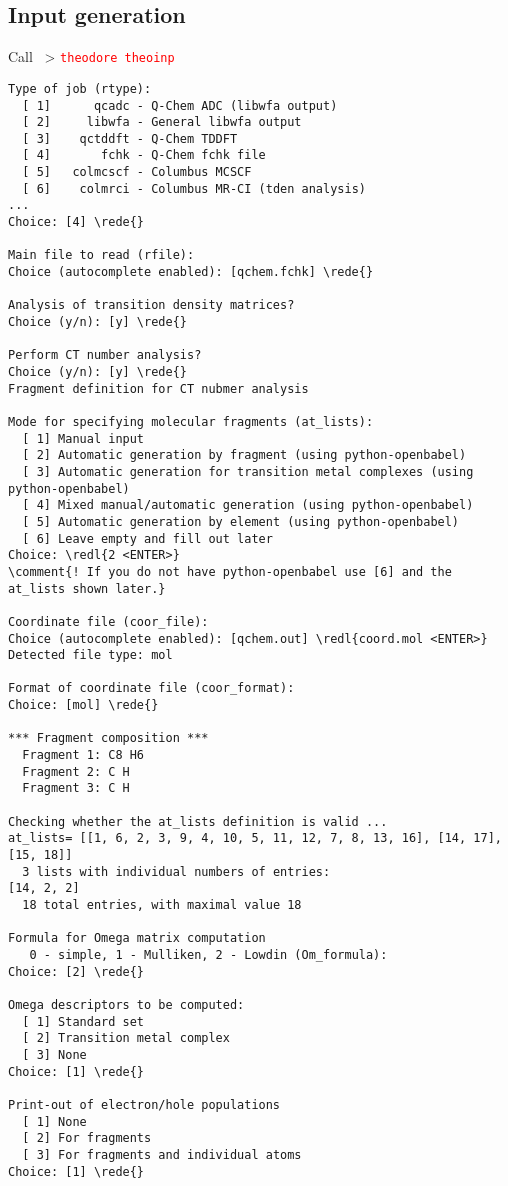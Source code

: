 \documentclass[DIV=12,headings=normal]{scrartcl}
\newcommand{\comment}[1]{\textcolor{blue}{#1}}
\newcommand{\redl}[1]{{\textcolor{red}{\texttt{#1}}}}
\newcommand{\rede}[1]{\redl{#1 <ENTER>}}
\newcommand{\comm}[1]{
\small
~> \redl{#1}
\normalsize
}
\newcounter{number}
\begin{document}
\clearpage
\subsection{Input generation}
Call \comm{theodore theoinp}
\scriptsize
\begin{Verbatim}[commandchars=\\\{\}]
Type of job (rtype):
  [ 1]      qcadc - Q-Chem ADC (libwfa output)
  [ 2]     libwfa - General libwfa output
  [ 3]    qctddft - Q-Chem TDDFT
  [ 4]       fchk - Q-Chem fchk file
  [ 5]   colmcscf - Columbus MCSCF
  [ 6]    colmrci - Columbus MR-CI (tden analysis)
...
Choice: [4] \rede{}

Main file to read (rfile):
Choice (autocomplete enabled): [qchem.fchk] \rede{}

Analysis of transition density matrices?
Choice (y/n): [y] \rede{}

Perform CT number analysis?
Choice (y/n): [y] \rede{}
Fragment definition for CT nubmer analysis

Mode for specifying molecular fragments (at_lists):
  [ 1] Manual input
  [ 2] Automatic generation by fragment (using python-openbabel)
  [ 3] Automatic generation for transition metal complexes (using python-openbabel)
  [ 4] Mixed manual/automatic generation (using python-openbabel)
  [ 5] Automatic generation by element (using python-openbabel)
  [ 6] Leave empty and fill out later
Choice: \redl{2 <ENTER>}
\comment{! If you do not have python-openbabel use [6] and the at_lists shown later.}

Coordinate file (coor_file):
Choice (autocomplete enabled): [qchem.out] \redl{coord.mol <ENTER>} 
Detected file type: mol

Format of coordinate file (coor_format):
Choice: [mol] \rede{} 

*** Fragment composition ***
  Fragment 1: C8 H6 
  Fragment 2: C H 
  Fragment 3: C H 

Checking whether the at_lists definition is valid ...
at_lists= [[1, 6, 2, 3, 9, 4, 10, 5, 11, 12, 7, 8, 13, 16], [14, 17], [15, 18]]
  3 lists with individual numbers of entries:
[14, 2, 2]
  18 total entries, with maximal value 18

Formula for Omega matrix computation
   0 - simple, 1 - Mulliken, 2 - Lowdin (Om_formula):
Choice: [2] \rede{}

Omega descriptors to be computed:
  [ 1] Standard set
  [ 2] Transition metal complex
  [ 3] None
Choice: [1] \rede{}

Print-out of electron/hole populations
  [ 1] None
  [ 2] For fragments
  [ 3] For fragments and individual atoms
Choice: [1] \rede{}


\end{Verbatim}
\end{document}
